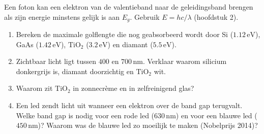 \begin{oefening}
Een foton kan een elektron van de valentieband naar de geleidingsband brengen als zijn energie minstens gelijk is aan \(E_g\). Gebruik \(E = hc/\lambda\) (hoofdstuk 2).

\begin{enumerate}
\item[(a)]
  Bereken de maximale golflengte die nog geabsorbeerd wordt door Si (\(1.12\,\mathrm{eV}\)), GaAs (\(1.42\,\mathrm{eV}\)), \(\mathrm{TiO_2}\) (\(3.2\,\mathrm{eV}\)) en diamant (\(5.5\,\mathrm{eV}\)).
\item[(b)]
  Zichtbaar licht ligt tussen \(400\) en \(700\,\mathrm{nm}\). Verklaar waarom silicium donkergrijs is, diamant doorzichtig en \(\mathrm{TiO_2}\) wit.
\item[(c)]
  Waarom zit \(\mathrm{TiO_2}\) in zonnecrème en in zelfreinigend glas?
\item[(d)]
  Een led zendt licht uit wanneer een elektron over de band gap terugvalt. Welke band gap is nodig voor een rode led (\(630\,\mathrm{nm}\)) en voor een blauwe led (\(450\,\mathrm{nm}\))? Waarom was de blauwe led zo moeilijk te maken (Nobelprijs 2014)?
\end{enumerate}
\end{oefening}
